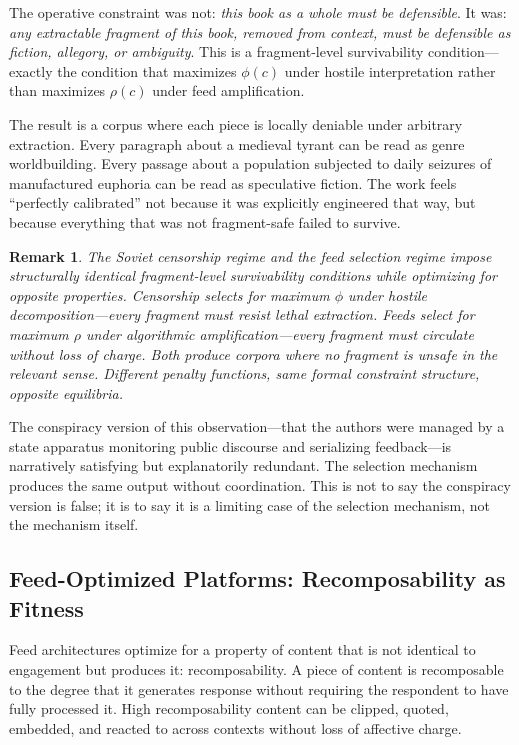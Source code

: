 \documentclass[12pt]{article}
\newtheorem{remark}{Remark}[section]
\newcommand{\bind}{\phi}
\newcommand{\recomp}{\rho}
\begin{document}
The operative constraint was not: \emph{this book as a whole must be
defensible}. It was: \emph{any extractable fragment of this book,
removed from context, must be defensible as fiction, allegory, or
ambiguity}. This is a fragment-level survivability condition---exactly
the condition that maximizes $\bind(c)$ under hostile interpretation
rather than maximizes $\recomp(c)$ under feed amplification.

The result is a corpus where each piece is locally deniable under
arbitrary extraction. Every paragraph about a medieval tyrant can be
read as genre worldbuilding. Every passage about a population subjected
to daily seizures of manufactured euphoria can be read as speculative
fiction. The work feels ``perfectly calibrated'' not because it was
explicitly engineered that way, but because everything that was not
fragment-safe failed to survive.

\begin{remark}
The Soviet censorship regime and the feed selection regime impose
structurally identical fragment-level survivability conditions while
optimizing for opposite properties. Censorship selects for maximum
$\bind$ under hostile decomposition---every fragment must resist lethal
extraction. Feeds select for maximum $\recomp$ under algorithmic
amplification---every fragment must circulate without loss of charge.
Both produce corpora where no fragment is unsafe in the relevant sense.
Different penalty functions, same formal constraint structure, opposite
equilibria.
\end{remark}

The conspiracy version of this observation---that the authors were
managed by a state apparatus monitoring public discourse and serializing
feedback---is narratively satisfying but explanatorily redundant. The
selection mechanism produces the same output without coordination. This
is not to say the conspiracy version is false; it is to say it is a
limiting case of the selection mechanism, not the mechanism itself.

\subsection{Feed-Optimized Platforms: Recomposability as Fitness}
\label{ssec:feed}

Feed architectures optimize for a property of content that is not
identical to engagement but produces it: recomposability. A piece of
content is recomposable to the degree that it generates response without
requiring the respondent to have fully processed it. High recomposability
content can be clipped, quoted, embedded, and reacted to across contexts
without loss of affective charge.
\end{document}
